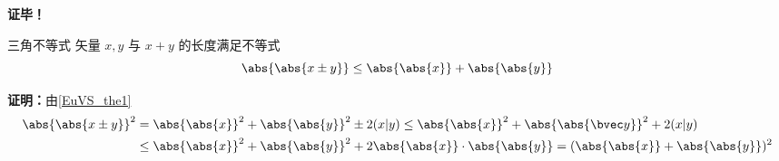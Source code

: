 \textbf{证毕！}
\begin{corollary}{三角不等式}\label{EuVS_cor1}
矢量 $ x, y$ 与 $ x+ y$ 的长度满足不等式
\begin{equation}
\abs{\abs{ x\pm y}}\leq\abs{\abs{ x}}+\abs{\abs{ y}}
\end{equation}
\end{corollary}
\textbf{证明：}由\autoref{EuVS_the1} 
\begin{equation}
\begin{aligned}
\abs{\abs{ x\pm y}}^2&=\abs{\abs{ x}}^2+\abs{\abs{ y}}^2\pm2( x| y)\leq\abs{\abs{ x}}^2+\abs{\abs{\bvec y}}^2+2( x| y)\\
&\leq \abs{\abs{ x}}^2+\abs{\abs{ y}}^2+2\abs{\abs{ x}}\cdot\abs{\abs{ y}}=(\abs{\abs{ x}}+\abs{\abs{ y}})^2
\end{aligned}
\end{equation}

